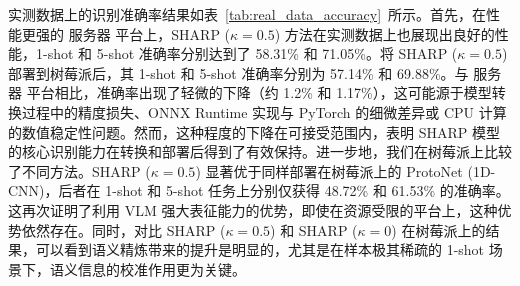 实测数据上的识别准确率结果如表~\ref{tab:real_data_accuracy}~所示。首先，在性能更强的 服务器 平台上，SHARP ($\kappa=0.5$) 方法在实测数据上也展现出良好的性能，1-shot 和 5-shot 准确率分别达到了 58.31\% 和 71.05\%。将 SHARP ($\kappa=0.5$) 部署到树莓派后，其 1-shot 和 5-shot 准确率分别为 57.14\% 和 69.88\%。与 服务器 平台相比，准确率出现了轻微的下降（约 1.2\% 和 1.17\%），这可能源于模型转换过程中的精度损失、ONNX Runtime 实现与 PyTorch 的细微差异或 CPU 计算的数值稳定性问题。然而，这种程度的下降在可接受范围内，表明 SHARP 模型的核心识别能力在转换和部署后得到了有效保持。进一步地，我们在树莓派上比较了不同方法。SHARP ($\kappa=0.5$) 显著优于同样部署在树莓派上的 ProtoNet (1D-CNN)，后者在 1-shot 和 5-shot 任务上分别仅获得 48.72\% 和 61.53\% 的准确率。这再次证明了利用 VLM 强大表征能力的优势，即使在资源受限的平台上，这种优势依然存在。同时，对比 SHARP ($\kappa=0.5$) 和 SHARP ($\kappa=0$) 在树莓派上的结果，可以看到语义精炼带来的提升是明显的，尤其是在样本极其稀疏的 1-shot 场景下，语义信息的校准作用更为关键。

\begin{table}[h!]
\centering
\caption{不同方法与平台在实测 HRRP 数据上的 3-way K-shot 识别准确率对比}
\label{tab:real_data_accuracy}
\end{table}
\captionsetup{skip=5pt}

